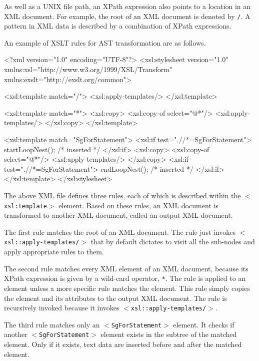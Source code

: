 As well as a UNIX file path, an XPath expression also points to a
location in an XML document.  For example, the root of an XML document
is denoted by \texttt{/}.  A pattern in XML data is described by a
combination of XPath expressions.


An example of XSLT rules for AST transformation are as follows.
\begin{framed}
\begin{src}
<?xml version="1.0" encoding="UTF-8"?>
<xsl:stylesheet version="1.0"
   xmlns:xsl="http://www.w3.org/1999/XSL/Transform"
   xmlns:exslt="http://exslt.org/common">

  <xsl:template match="/">
    <xsl:apply-templates/>
  </xsl:template>

  <xsl:template match="*">
    <xsl:copy>
      <xsl:copy-of select="@*"/>
      <xsl:apply-templates/>
    </xsl:copy>
  </xsl:template>

  <xsl:template match="SgForStatement">
    <xsl:if test=".//*=SgForStatement">
    startLoopNest(); /* inserted */
    </xsl:if>
    <xsl:copy>
      <xsl:copy-of select="@*"/>
      <xsl:apply-templates/>
    </xsl:copy>
    <xsl:if test=".//*=SgForStatement">
    endLoopNest(); /* inserted */
    </xsl:if>
  </xsl:template>
</xsl:stylesheet>
\end{src}
\end{framed}
The above XML file defines three rules, each of which is described
within the \texttt{$<$xsl:template$>$} element. Based on these rules, an XML
document is transformed to another XML document, called an output XML
document.

The first rule matches the root of an XML document. The rule just
invokes \texttt{$<$xsl::apply-templates/$>$} that by default dictates to
visit all the sub-nodes and apply appropriate rules to them.

The second rule matches every XML element of an XML document, because
its XPath expression is given by a wild-card operator, \texttt{*}. The
rule is applied to an element unless a more specific rule matches the
element.  This rule simply copies the element and its attributes to the
output XML document.  The rule is recursively invoked because it invokes
\texttt{$<$xsl::apply-templates/$>$}.

The third rule matches only an \texttt{$<$SgForStatement$>$} element. It
checks if another \texttt{$<$SgForStatement$>$} element exists in the subtree
of the matched element.  Only if it exists, text data are inserted
before and after the matched element.

